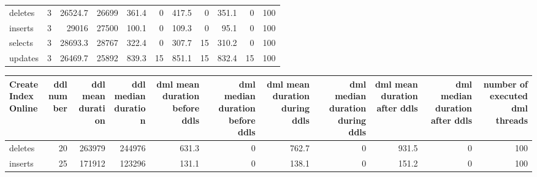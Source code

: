 \begin{tabular}{lrrrrrrrrrr}
\hline
 deletes     &            3 &             26524.7 &                 26699 &                           361.4 &                                 0 &                           417.5 &                                 0 &                          351.1 &                                0 &                              100 \\
 inserts     &            3 &             29016   &                 27500 &                           100.1 &                                 0 &                           109.3 &                                 0 &                           95.1 &                                0 &                              100 \\
 selects     &            3 &             28693.3 &                 28767 &                           322.4 &                                 0 &                           307.7 &                                15 &                          310.2 &                                0 &                              100 \\
 updates     &            3 &             26469.7 &                 25892 &                           839.3 &                                15 &                           851.1 &                                15 &                          832.4 &                               15 &                              100 \\
\hline
\end{tabular}\begin{tabular}{lrrrrrrrrrr}
\hline
 CreateIndexOnline   &   ddl number &   ddl mean duration &   ddl median duration &   dml mean duration before ddls &   dml median duration before ddls &   dml mean duration during ddls &   dml median duration during ddls &   dml mean duration after ddls &   dml median duration after ddls &   number of executed dml threads \\
\hline
 deletes             &           20 &              263979 &                244976 &                           631.3 &                                 0 &                           762.7 &                                 0 &                          931.5 &                                0 &                              100 \\
 inserts             &           25 &              171912 &                123296 &                           131.1 &                                 0 &                           138.1 &                                 0 &                          151.2 &                                0 &                              100 \\

\end{tabular}
